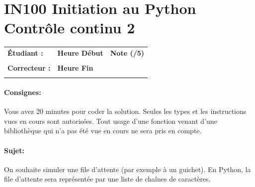 \documentclass[a4paper,11pt]{article}
\begin{document}
\newpage


\section*{\center IN100 Initiation au Python\\
Contrôle continu 2}

\vspace{0.5 cm}

\begin{table}[h!]
\centering
\renewcommand{\arraystretch}{1.4} %
\begin{tabular}{|p{10cm}|p{3cm}|p{2cm}|}
\hline
\textbf{Étudiant :} & \textbf{Heure Début }  & \textbf{Note (/5) }  \\
& & \\
\hline
\textbf{Correcteur :} & \textbf{Heure Fin } & \\
& & \\
\hline

\hline
\end{tabular}
\end{table}

\paragraph*{Consignes:} Vous avez 20 minutes pour coder la solution. Seules les types et les instructions vues en cours sont autorisées. Tout usage d'une fonction 
venant d'une bibliothèque qui n'a pas été vue en cours ne sera pris en compte. 



\paragraph*{Sujet:}

On souhaite simuler une file d’attente (par exemple à un guichet).
En Python, la file d’attente sera représentée par une liste de chaînes de caractères. 
\vspace{-0.3 cm}
\end{document}
